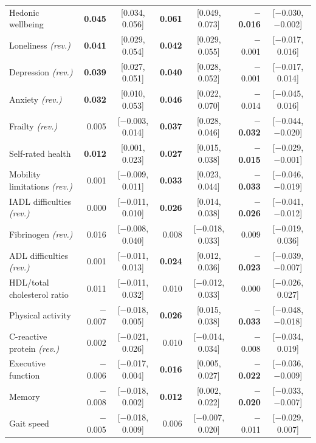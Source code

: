 \begin{longtable}{lrcrcrc}
Hedonic wellbeing & \textbf{0.045} & [0.034, 0.056] & \textbf{0.061} & [0.049, 0.073] & \textbf{$-$0.016} & [$-$0.030, $-$0.002] \\
Loneliness \textit{(rev.)} & \textbf{0.041} & [0.029, 0.054] & \textbf{0.042} & [0.029, 0.055] & $-$0.001 & [$-$0.017, 0.016] \\
Depression \textit{(rev.)} & \textbf{0.039} & [0.027, 0.051] & \textbf{0.040} & [0.028, 0.052] & $-$0.001 & [$-$0.017, 0.014] \\
Anxiety \textit{(rev.)} & \textbf{0.032} & [0.010, 0.053] & \textbf{0.046} & [0.022, 0.070] & $-$0.014 & [$-$0.045, 0.016] \\
Frailty \textit{(rev.)} & 0.005 & [$-$0.003, 0.014] & \textbf{0.037} & [0.028, 0.046] & \textbf{$-$0.032} & [$-$0.044, $-$0.020] \\
Self-rated health & \textbf{0.012} & [0.001, 0.023] & \textbf{0.027} & [0.015, 0.038] & \textbf{$-$0.015} & [$-$0.029, $-$0.001] \\
Mobility limitations \textit{(rev.)} & 0.001 & [$-$0.009, 0.011] & \textbf{0.033} & [0.023, 0.044] & \textbf{$-$0.033} & [$-$0.046, $-$0.019] \\
IADL difficulties \textit{(rev.)} & 0.000 & [$-$0.011, 0.010] & \textbf{0.026} & [0.014, 0.038] & \textbf{$-$0.026} & [$-$0.041, $-$0.012] \\
Fibrinogen \textit{(rev.)} & 0.016 & [$-$0.008, 0.040] & 0.008 & [$-$0.018, 0.033] & 0.009 & [$-$0.019, 0.036] \\
ADL difficulties \textit{(rev.)} & 0.001 & [$-$0.011, 0.013] & \textbf{0.024} & [0.012, 0.036] & \textbf{$-$0.023} & [$-$0.039, $-$0.007] \\
HDL/total cholesterol ratio & 0.011 & [$-$0.011, 0.032] & 0.010 & [$-$0.012, 0.033] & 0.000 & [$-$0.026, 0.027] \\
Physical activity & $-$0.007 & [$-$0.018, 0.005] & \textbf{0.026} & [0.015, 0.038] & \textbf{$-$0.033} & [$-$0.048, $-$0.018] \\
C-reactive protein \textit{(rev.)} & 0.002 & [$-$0.021, 0.026] & 0.010 & [$-$0.014, 0.034] & $-$0.008 & [$-$0.034, 0.019] \\
Executive function & $-$0.006 & [$-$0.017, 0.004] & \textbf{0.016} & [0.005, 0.027] & \textbf{$-$0.022} & [$-$0.036, $-$0.009] \\
Memory & $-$0.008 & [$-$0.018, 0.002] & \textbf{0.012} & [0.002, 0.022] & \textbf{$-$0.020} & [$-$0.033, $-$0.007] \\
Gait speed & $-$0.005 & [$-$0.018, 0.009] & 0.006 & [$-$0.007, 0.020] & $-$0.011 & [$-$0.029, 0.007] \\

\end{longtable}
